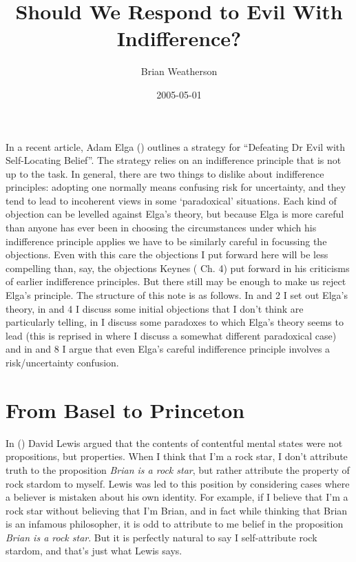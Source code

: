 \documentclass[
  11pt,
  letterpaper,
  DIV=11,
  numbers=noendperiod,
  oneside]{scrartcl}
\title{Should We Respond to Evil With Indifference?}
\author{Brian Weatherson}
\date{2005-05-01}
\begin{document}
\maketitle
In a recent article, Adam Elga () outlines
a strategy for ``Defeating Dr Evil with Self-Locating Belief''. The
strategy relies on an indifference principle that is not up to the task.
In general, there are two things to dislike about indifference
principles: adopting one normally means confusing risk for uncertainty,
and they tend to lead to incoherent views in some `paradoxical'
situations. Each kind of objection can be levelled against Elga's
theory, but because Elga is more careful than anyone has ever been in
choosing the circumstances under which his indifference principle
applies we have to be similarly careful in focussing the objections.
Even with this care the objections I put forward here will be less
compelling than, say, the objections Keynes
( Ch. 4) put forward in his criticisms of
earlier indifference principles. But there still may be enough to make
us reject Elga's principle. The structure of this note is as follows. In
and 2 I set out Elga's theory, in and 4 I discuss some initial
objections that I don't think are particularly telling, in I discuss
some paradoxes to which Elga's theory seems to lead (this is reprised in
where I discuss a somewhat different paradoxical case) and in and 8 I
argue that even Elga's careful indifference principle involves a
risk/uncertainty confusion.

\section{From Basel to Princeton}\label{sec-basel}

In () David Lewis argued that the
contents of contentful mental states were not propositions, but
properties. When I think that I'm a rock star, I don't attribute truth
to the proposition \emph{Brian is a rock star}, but rather attribute the
property of rock stardom to myself. Lewis was led to this position by
considering cases where a believer is mistaken about his own identity.
For example, if I believe that I'm a rock star without believing that
I'm Brian, and in fact while thinking that Brian is an infamous
philosopher, it is odd to attribute to me belief in the proposition
\emph{Brian is a rock star}. But it is perfectly natural to say I
self-attribute rock stardom, and that's just what Lewis says.
\end{document}
